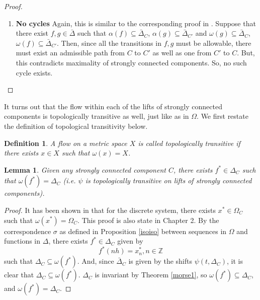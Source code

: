 \documentclass[11pt]{article}
\newtheorem{defn}[thm]{Definition}
\newtheorem{lem}[thm]{Lemma}
\begin{document}
\begin{proof}
\begin{enumerate}
\item \textbf{No cycles}
Again, this is similar to the corresponding proof in \cite{discretesystems}.  Suppose that there exist $f, g \in \bar{\Delta}$ such that $\alpha(f) \subseteq \bar{\Delta}_C$, $\alpha(g) \subseteq \bar{\Delta}_{C'}$ and $\omega(g) \subseteq \bar{\Delta}_C$, $\omega(f) \subseteq \bar{\Delta}_{C'}$.  Then, since all the transitions in $f,g$ must be allowable, there must exist an admissible path from $C$ to $C'$ as well as one from $C'$ to $C$.  But, this contradicts maximality of strongly connected components.  So, no such cycle exists.
\end{enumerate}


\end{proof}


It turns out that the flow within each of the lifts of strongly connected components is topologically transitive as well, just like as in $\Omega$.  We first restate the definition of topological transitivity below.

\begin{defn}\label{topologicallytransitive}
A flow on a metric space $X$ is called topologically transitive if there exists $x \in X$ such that $\omega(x) = X$.
\end{defn}

\begin{lem}\label{omegalimit}
Given any strongly connected component $C$, there exists $f^* \in \Delta_C$ such that $\omega(f^*) = \Delta_C$ (i.e. $\psi$ is topologically transitive on lifts of strongly connected components).
\end{lem}

\begin{proof}
It has been shown in \cite{discretesystems} that for the discrete system, there exists $x^* \in \Omega_C$ such that $\omega(x^*) = \Omega_C$.  This proof is also state in Chapter 2. By the correspondence $\sigma$ as defined in Proposition \ref{isoiso} between sequences in $\Omega$ and functions in $\Delta$, there exists $f^* \in \Delta_C$ given by $$ f^*(nh) = x^*_n, n \in \mathbb{Z}$$ such that $\Delta_C \subseteq \omega(f^*)$.  And, since $\bar{\Delta}_C$ is given by the shifts $\psi(t,\Delta_C)$, it is clear that $\Delta_C \subseteq \omega(f^*)$.  $\Delta_C$ is invariant by Theorem \ref{morse1}, so $\omega(f^*) \subseteq \Delta_C$, and $\omega(f^*) = \Delta_C$.
\end{proof}
\end{document}
